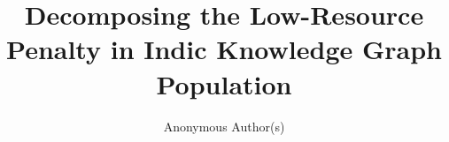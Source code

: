 \documentclass{llncs}
\begin{document}
%
\title{Decomposing the Low-Resource Penalty in Indic Knowledge Graph Population}
\author{Anonymous Author(s)}

\maketitle
\end{document}
